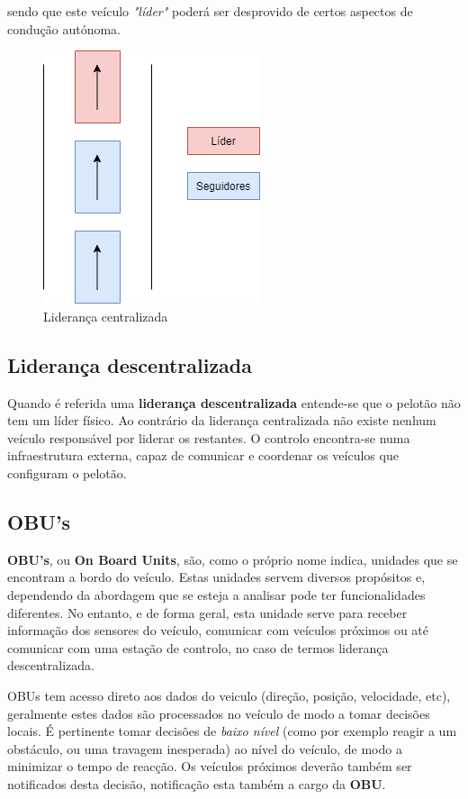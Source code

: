 sendo que este veículo \textit{"líder"} poderá ser desprovido de certos aspectos de condução autónoma.
\begin{figure}[H]
    \centering
    \includegraphics[scale=0.4]{LEI - Article/Images/lidCentr.png}
    \caption{Liderança centralizada}
    \label{fig:my_label}
\end{figure}

\subsection{Liderança descentralizada}
Quando é referida uma \textbf{liderança descentralizada} entende-se que o pelotão não tem um líder físico. Ao contrário da liderança centralizada não existe nenhum veículo responsável por liderar os restantes. O controlo encontra-se numa infraestrutura externa, capaz de comunicar e coordenar os veículos que configuram o pelotão.

\subsection{OBU's}
\textbf{OBU's}, ou \textbf{On Board Units}, são, como o próprio nome indica, unidades que se encontram a bordo do veículo. Estas unidades servem diversos propósitos e, dependendo da abordagem que se esteja a analisar pode ter funcionalidades diferentes. No entanto, e de forma geral, esta unidade serve para receber informação dos sensores do veículo, comunicar com veículos próximos ou até comunicar com uma estação de controlo, no caso de termos liderança descentralizada.


OBUs tem acesso direto aos dados do veiculo (direção, posição, velocidade, etc), geralmente estes dados são processados no veículo de modo a tomar decisões locais. É pertinente tomar decisões de \textit{baixo nível} (como por exemplo reagir a um obstáculo, ou uma travagem inesperada) ao nível do veículo, de modo a minimizar o tempo de reacção. Os veículos próximos deverão também ser notificados desta decisão, notificação esta também a cargo da \textbf{OBU}.